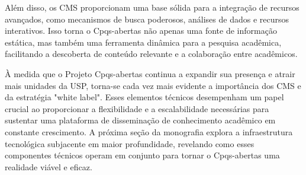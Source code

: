Além disso, os CMS proporcionam uma base sólida para a integração de recursos avançados, como mecanismos de busca poderosos, análises de dados e recursos interativos. Isso torna o Cpqs-abertas não apenas uma fonte de informação estática, mas também uma ferramenta dinâmica para a pesquisa acadêmica, facilitando a descoberta de conteúdo relevante e a colaboração entre acadêmicos.

À medida que o Projeto Cpqs-abertas continua a expandir sua presença e atrair mais unidades da USP, torna-se cada vez mais evidente a importância dos CMS e da estratégia "white label". Esses elementos técnicos desempenham um papel crucial ao proporcionar a flexibilidade e a escalabilidade necessárias para sustentar uma plataforma de disseminação de conhecimento acadêmico em constante crescimento. A próxima seção da monografia explora a infraestrutura tecnológica subjacente em maior profundidade, revelando como esses componentes técnicos operam em conjunto para tornar o Cpqs-abertas uma realidade viável e eficaz.